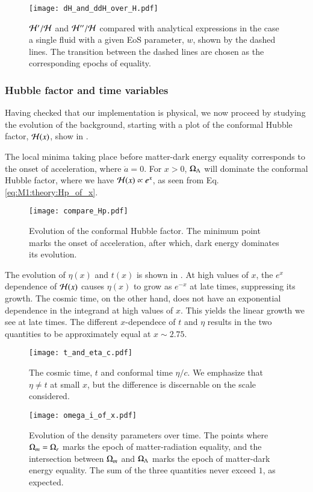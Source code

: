 \begin{figure}[ht!]
    \texttt{[image: dH\_and\_ddH\_over\_H.pdf]}
    \caption{$\mathcal{H}'/\mathcal{H}$ and $\mathcal{H}''/\mathcal{H}$ compared with analytical expressions in the case a single fluid with a given EoS parameter, $w$, shown by the dashed lines. The transition between the dashed lines are chosen as the corresponding epochs of equality.}
    \label{fig:M1:dH_ddH_over_H}
\end{figure}


\subsubsection{Hubble factor and time variables}
Having checked that our implementation is physical, we now proceed by studying the evolution of the background, starting with a plot of the conformal Hubble factor, $\mathcal{H}(x)$, show in .

The local minima taking place before matter-dark energy equality corresponds to the onset of acceleration, where $\ddot{a}=0$. For $x>0$, $\Omega_{\Lambda}$ will dominate the conformal Hubble factor, where we have $\mathcal{H}(x)\propto e^x$, as seen from Eq. \eqref{eq:M1:theory:Hp_of_x}. 
\begin{figure}[ht!]
    \texttt{[image: compare\_Hp.pdf]}
    \caption{Evolution of the conformal Hubble factor. The minimum point marks the onset of acceleration, after which, dark energy dominates its evolution.}
    \label{fig:M1:Hp_of_x}
\end{figure}

The evolution of $\eta(x)$ and $t(x)$ is shown in . At high values of $x$, the $e^x$ dependence of $\mathcal{H}(x)$ causes $\eta(x)$ to grow as $e^{-x}$ at late times, suppressing its growth. The cosmic time, on the other hand, does not have an exponential dependence in the integrand at high values of $x$. This yields the linear growth we see at late times. The different $x$-dependece of $t$ and $\eta$ results in the two quantities to be approximately equal at $x\sim2.75$.    


\begin{figure}[ht!]
    \texttt{[image: t\_and\_eta\_c.pdf]} 
    \caption{The cosmic time, $t$ and conformal time $\eta/c$. We emphasize that $\eta\neq t$ at small $x$, but the difference is discernable on the scale considered.}
    \label{fig:M1:t_and_eta_of_x}
\end{figure}


\begin{figure}[ht!]
    \texttt{[image: omega\_i\_of\_x.pdf]}
    \caption{Evolution of the density parameters over time. The points where $\Omega_{m}=\Omega_{r}$ marks the epoch of matter-radiation equality, and the intersection between $\Omega_{m}$ and $\Omega_{\Lambda}$ marks the epoch of matter-dark energy equality. The sum of the three quantities never exceed $1$, as expected.}
    \label{fig:M1:Omegas}
\end{figure}



